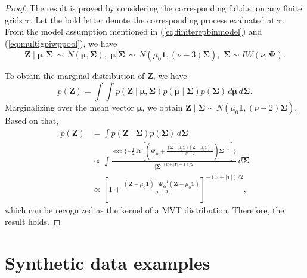 \begin{proof}
The result is proved by considering the corresponding f.d.d.s. on any finite grids $\boldsymbol{\tau}$. Let the bold letter denote the corresponding process evaluated at $\boldsymbol{\tau}$. From the model assumption mentioned in (\ref{eq:finiterepbinmodel}) 
and (\ref{eq:multigpiwppool}), we have
\begin{equation*}
    \mathbf{Z}\mid\boldsymbol{\mu},\boldsymbol{\Sigma}\,\sim\, N(\boldsymbol{\mu},\boldsymbol{\Sigma}),\,\, \boldsymbol{\mu}|\boldsymbol{\Sigma}\,\sim\, N(\mu_0\mathbf{1},(\nu-3)\boldsymbol{\Sigma}),\,\, \boldsymbol{\Sigma}\sim IW(\nu,\boldsymbol{\Psi}).
\end{equation*}
    
To obtain the marginal distribution of $\mathbf{Z}$, we have
\begin{equation*}
    p(\mathbf{Z})=\int\int p(\mathbf{Z}\mid \boldsymbol{\mu},\boldsymbol{\Sigma})p(\boldsymbol{\mu}\mid \boldsymbol{\Sigma})p(\boldsymbol{\Sigma}) \, d\boldsymbol{\mu} \, d\boldsymbol{\Sigma}.
    \label{eq:marginalsignal}
\end{equation*}
Marginalizing over the mean vector $\boldsymbol{\mu}$, we obtain 
$\mathbf{Z}\mid\boldsymbol{\Sigma}\sim N(\mu_0\mathbf{1},(\nu-2)\boldsymbol{\Sigma})$. 
Based on that, 
\begin{equation*}
    \begin{split}
        p(\mathbf{Z})&=\int p(\mathbf{Z}\mid \boldsymbol{\Sigma})p(\boldsymbol{\Sigma}) \, d\boldsymbol{\Sigma}\\
        &\propto \int \frac{\exp\{-\frac{1}{2}\text{Tr}[(\boldsymbol{\Psi}_{\boldsymbol{\phi}}+\frac{(\mathbf{Z}-\mu_0\mathbf{1})(\mathbf{Z}-\mu_0\mathbf{1})^{\top}}{\nu-2})\boldsymbol{\Sigma}^{-1}]\}}{|\boldsymbol{\Sigma}|^{(\nu+|\boldsymbol{\tau}|+1)/2}} \, d\boldsymbol{\Sigma}\\
        &\propto [1+\frac{(\mathbf{Z}-\mu_0\mathbf{1})^{\top}\boldsymbol{\Psi}_{\boldsymbol{\phi}}^{-1}(\mathbf{Z}-\mu_0\mathbf{1})}{\nu-2}]^{-(\nu+|\boldsymbol{\tau}|)/2},
   \end{split}
   \label{eq:marginalizescalematrix}
\end{equation*}
which can be recognized as the kernel of a MVT distribution. Therefore, the result holds. 

\end{proof}




\section{Synthetic data examples}
\label{sec:simstudy}

